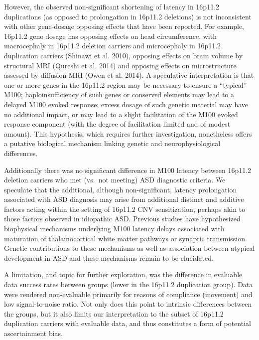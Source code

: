 \documentclass[]{article}
\begin{document}
However, the observed non-significant shortening of latency in 16p11.2
duplications (as opposed to prolongation in 16p11.2 deletions) is not
inconsistent with other gene-dosage opposing effects that have been
reported. For example, 16p11.2 gene dosage has opposing effects on head
circumference, with macrocephaly in 16p11.2 deletion carriers and
microcephaly in 16p11.2 duplication carriers (Shinawi et al. 2010),
opposing effects on brain volume by structural MRI (Qureshi et al. 2014)
and opposing effects on microstructure assessed by diffusion MRI (Owen
et al. 2014). A speculative interpretation is that one or more genes in
the 16p11.2 region may be necessary to ensure a ``typical'' M100;
haploinsufficiency of such genes or conserved elements may lead to a
delayed M100 evoked response; excess dosage of such genetic material may
have no additional impact, or may lead to a slight facilitation of the
M100 evoked response component (with the degree of facilitation limited
and of modest amount). This hypothesis, which requires further
investigation, nonetheless offers a putative biological mechanism
linking genetic and neurophysiological differences.

\medskip

Additionally there was no significant difference in M100 latency between
16p11.2 deletion carriers who met (vs.~not meeting) ASD diagnostic
criteria. We speculate that the additional, although non-significant,
latency prolongation associated with ASD diagnosis may arise from
additional distinct and additive factors acting within the setting of
16p11.2 CNV sensitization, perhaps akin to those factors observed in
idiopathic ASD. Previous studies have hypothesized biophysical
mechanisms underlying M100 latency delays associated with maturation of
thalamocortical white matter pathways or synaptic transmission. Genetic
contributions to these mechanisms as well as association between
atypical development in ASD and these mechanisms remain to be
elucidated.

\medskip

A limitation, and topic for further exploration, was the difference in
evaluable data success rates between groups (lower in the 16p11.2
duplication group). Data were rendered non-evaluable primarily for
reasons of compliance (movement) and low signal-to-noise ratio. Not only
does this point to intrinsic differences between the groups, but it also
limits our interpretation to the subset of 16p11.2 duplication carriers
with evaluable data, and thus constitutes a form of potential
ascertainment bias.
\end{document}
